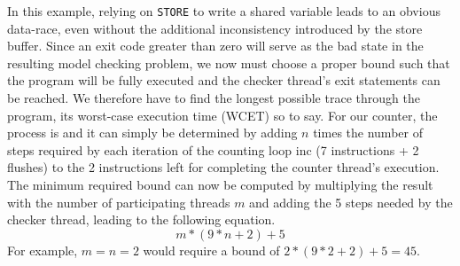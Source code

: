 In this example, relying on \lstinline[style=asm]{STORE} to write a shared variable leads to an obvious data-race, even without the additional inconsistency introduced by the store buffer.
Since an exit code greater than zero will serve as the bad state in the resulting model checking problem, we now must choose a proper bound
such that the program will be fully executed
and the checker thread's exit statements can be reached.
We therefore have to find the longest possible trace through the program, its worst-case execution time (WCET) so to say.
For our  counter, the process is  and it can simply be determined by adding $n$ times the number of steps required by each iteration of the counting loop {\color{red!60!black}\textsf{inc}} (7 instructions + 2 flushes) to the 2 instructions left for completing the counter thread's execution.
The minimum required bound can now be computed by multiplying the result with the number of participating threads $m$ and adding the 5 steps needed by the checker thread, leading to the following equation.
\[
  m * (9 * n + 2) + 5
\]
For example, $m = n = 2$ would require a bound of $2 * (9 * 2 + 2) + 5 = 45$.

